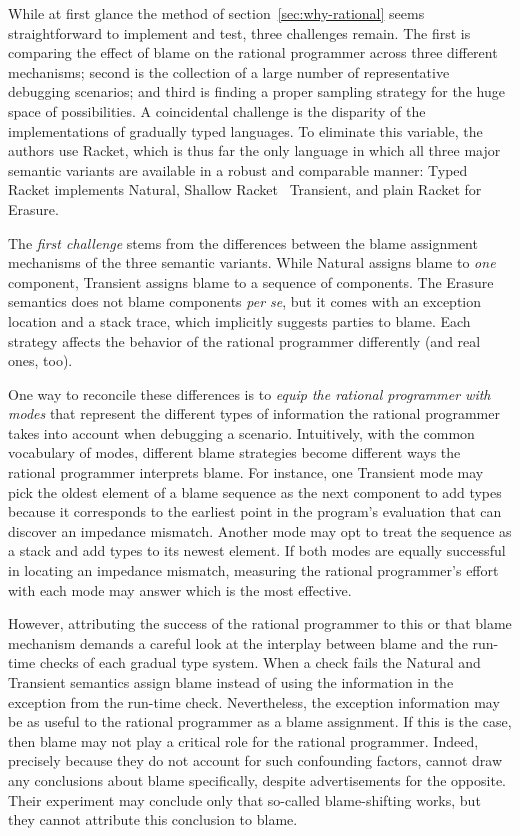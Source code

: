 
While at first glance the method of section~\ref{sec:why-rational} seems
straightforward to implement and test, three challenges remain. The first is
comparing the effect of blame on the rational programmer across three different
mechanisms; second is the collection of a large number of representative
debugging scenarios; and third is finding a proper sampling strategy for the
huge space of possibilities. A coincidental challenge is the disparity of the
implementations of gradually typed languages. To eliminate this variable, the
authors use Racket, which is thus far the only language in which all three major
semantic variants are available in a robust and comparable manner:
Typed Racket implements Natural, Shallow Racket~\citep{ttt21}
Transient, and plain Racket for Erasure. 

The {\em first challenge\/} stems from the differences between the blame
assignment mechanisms of the three semantic variants.  While Natural assigns
blame to {\em one\/} component, Transient assigns blame to a sequence of
components. The Erasure semantics does not blame components {\it per se\/}, but
it comes with an exception location and a stack trace, which implicitly suggests
parties to blame.  Each strategy affects the behavior of the rational programmer
differently (and real ones, too).

One way to reconcile these differences is to {\em equip the rational
programmer with modes \/} that represent the different types of
information the rational programmer takes into account when debugging a
scenario. Intuitively, with the common vocabulary of modes, different
blame strategies become different ways the rational programmer  interprets
blame.  For instance, one Transient mode may pick the oldest element of a
blame sequence as the next component to add types because it corresponds to the
earliest point in the program's evaluation that can discover an impedance
mismatch.  Another mode may opt to treat the sequence as a stack and add
types to its newest element.  If both modes are equally successful in
locating an impedance mismatch, measuring the rational programmer's effort with each mode
may answer which is the most effective.


However, attributing the success of the rational programmer to this or
that blame mechanism demands a careful look at the interplay between blame
and the run-time checks of each gradual type system. When a check fails
the Natural and Transient semantics assign blame instead of using the
information in the exception from the run-time check. Nevertheless, the
exception information may be as useful to the rational
programmer as a blame assignment. If this is the case, then blame may not play a critical
role for the rational programmer. Indeed, precisely because they do not
account for such confounding factors, \citet{lksfd-popl-2020} cannot draw any
conclusions about blame specifically, despite advertisements for the
opposite. Their experiment may conclude only that so-called blame-shifting
works, but they cannot attribute this conclusion to blame. 

